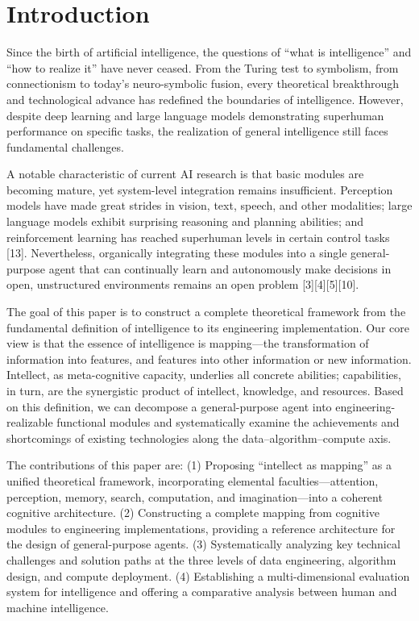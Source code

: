 \documentclass[12pt,a4paper]{article}
\begin{document}
\section{Introduction}
Since the birth of artificial intelligence, the questions of “what is intelligence” and “how to realize it” have never ceased. From the Turing test to symbolism, from connectionism to today’s neuro-symbolic fusion, every theoretical breakthrough and technological advance has redefined the boundaries of intelligence. However, despite deep learning and large language models demonstrating superhuman performance on specific tasks, the realization of general intelligence still faces fundamental challenges.

A notable characteristic of current AI research is that basic modules are becoming mature, yet system-level integration remains insufficient. Perception models have made great strides in vision, text, speech, and other modalities; large language models exhibit surprising reasoning and planning abilities; and reinforcement learning has reached superhuman levels in certain control tasks [13]. Nevertheless, organically integrating these modules into a single general-purpose agent that can continually learn and autonomously make decisions in open, unstructured environments remains an open problem [3][4][5][10].

The goal of this paper is to construct a complete theoretical framework from the fundamental definition of intelligence to its engineering implementation. Our core view is that the essence of intelligence is mapping—the transformation of information into features, and features into other information or new information. Intellect, as meta-cognitive capacity, underlies all concrete abilities; capabilities, in turn, are the synergistic product of intellect, knowledge, and resources. Based on this definition, we can decompose a general-purpose agent into engineering-realizable functional modules and systematically examine the achievements and shortcomings of existing technologies along the data–algorithm–compute axis.

The contributions of this paper are:
(1) Proposing “intellect as mapping” as a unified theoretical framework, incorporating elemental faculties—attention, perception, memory, search, computation, and imagination—into a coherent cognitive architecture.
(2) Constructing a complete mapping from cognitive modules to engineering implementations, providing a reference architecture for the design of general-purpose agents.
(3) Systematically analyzing key technical challenges and solution paths at the three levels of data engineering, algorithm design, and compute deployment.
(4) Establishing a multi-dimensional evaluation system for intelligence and offering a comparative analysis between human and machine intelligence.
\end{document}
